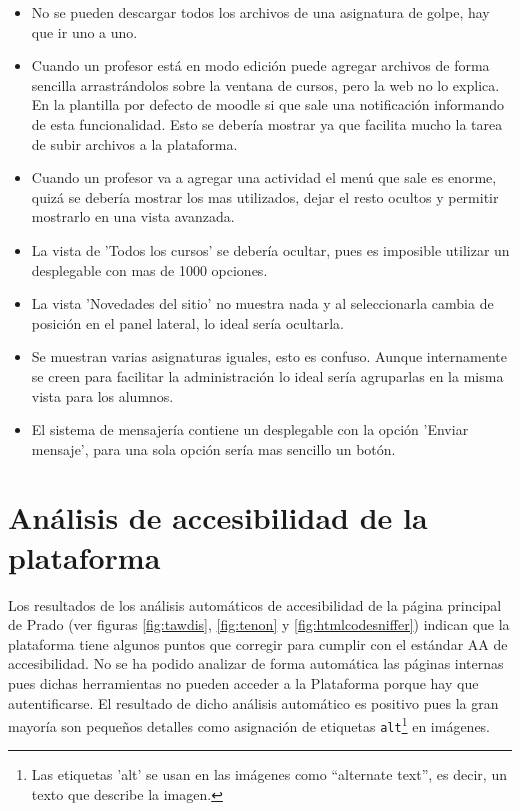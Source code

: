 \begin{itemize}
\item No se pueden descargar todos los archivos de una asignatura de golpe, hay que ir uno a uno.
\item Cuando un profesor está en modo edición puede agregar archivos de forma sencilla arrastrándolos sobre la ventana de cursos, pero la web no lo explica. En la plantilla por defecto de moodle si que sale una notificación informando de esta funcionalidad. Esto se debería mostrar ya que facilita mucho la tarea de subir archivos a la plataforma.
\item Cuando un profesor va a agregar una actividad el menú que sale es enorme, quizá se debería mostrar los mas utilizados, dejar el resto ocultos y permitir mostrarlo en una vista avanzada.
\item La vista de 'Todos los cursos' se debería ocultar, pues es imposible utilizar un desplegable con mas de 1000 opciones.
\item La vista 'Novedades del sitio' no muestra nada y al seleccionarla cambia de posición en el panel lateral, lo ideal sería ocultarla.
\item Se muestran varias asignaturas iguales, esto es confuso. Aunque internamente se creen para facilitar la administración lo ideal sería agruparlas en la misma vista para los alumnos.
\item El sistema de mensajería contiene un desplegable con la opción 'Enviar mensaje', para una sola opción sería mas sencillo un botón.

\end{itemize}

\section{Análisis de accesibilidad de la plataforma}

Los resultados de los análisis automáticos de accesibilidad de la página principal de Prado (ver figuras \ref{fig:tawdis}, \ref{fig:tenon} y \ref{fig:htmlcodesniffer}) indican que la plataforma tiene algunos puntos que corregir para cumplir con el estándar AA de accesibilidad. No se ha podido analizar de forma automática las páginas internas pues dichas herramientas no pueden acceder a la Plataforma porque hay que autentificarse. El resultado de dicho análisis automático es positivo pues la gran mayoría son pequeños detalles como asignación de etiquetas \texttt{alt}\footnote{Las etiquetas 'alt' se usan en las imágenes como “alternate text”, es decir, un texto que describe la imagen.} en imágenes.

